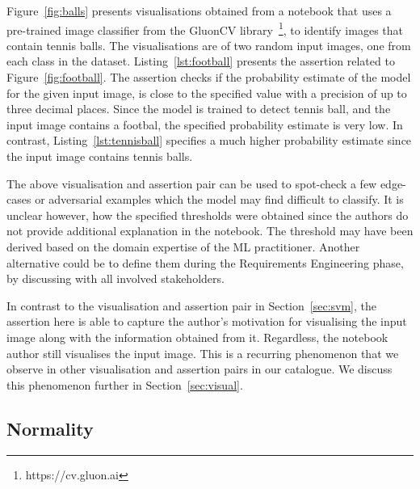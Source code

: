\documentclass[acmsmall,screen,review,anonymous]{acmart}
\begin{document}
Figure~\ref{fig:balls} presents visualisations obtained from a notebook that uses a pre-trained image classifier from the GluonCV library~\footnote{https://cv.gluon.ai}, to identify images that contain tennis balls. The visualisations are of two random input images, one from each class in the dataset. Listing~\ref{lst:football} presents the assertion related to Figure~\ref{fig:football}. The assertion checks if the probability estimate of the model for the given input image, is close to the specified value with a precision of up to three decimal places. Since the model is trained to detect tennis ball, and the input image contains a footbal, the specified probability estimate is very low. In contrast, Listing~\ref{lst:tennisball} specifies a much higher probability estimate since the input image contains tennis balls.

The above visualisation and assertion pair can be used to spot-check a few edge-cases or adversarial examples which the model may find difficult to classify. It is unclear however, how the specified thresholds were obtained since the authors do not provide additional explanation in the notebook. The threshold may have been derived based on the domain expertise of the ML practitioner. Another alternative could be to define them during the Requirements Engineering phase, by discussing with all involved stakeholders\cite{CITEME}.

In contrast to the visualisation and assertion pair in Section~\ref{sec:svm}, the assertion here is able to capture the author's motivation for visualising the input image along with the information obtained from it. Regardless, the notebook author still visualises the input image. This is a recurring phenomenon that we observe in other visualisation and assertion pairs in our catalogue. We discuss this phenomenon further in Section~\ref{sec:visual}.

\subsection{Normality}\label{sec:normal}
\end{document}
